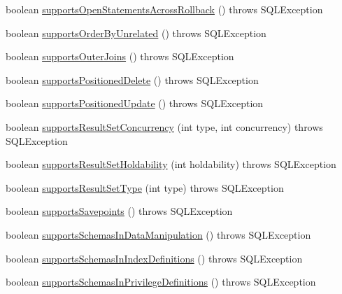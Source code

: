 \begin{DoxyCompactItemize}
\item 
boolean \mbox{\hyperlink{classcom_1_1mysql_1_1jdbc_1_1_database_meta_data_a1b59c56b378d4d91fc6f113c2758672b}{supports\+Open\+Statements\+Across\+Rollback}} ()  throws S\+Q\+L\+Exception 
\item 
boolean \mbox{\hyperlink{classcom_1_1mysql_1_1jdbc_1_1_database_meta_data_a198d63c037b4e7e315448f03ab6ae109}{supports\+Order\+By\+Unrelated}} ()  throws S\+Q\+L\+Exception 
\item 
boolean \mbox{\hyperlink{classcom_1_1mysql_1_1jdbc_1_1_database_meta_data_a06a7b70011cbdf146cde2d6bad2b3267}{supports\+Outer\+Joins}} ()  throws S\+Q\+L\+Exception 
\item 
boolean \mbox{\hyperlink{classcom_1_1mysql_1_1jdbc_1_1_database_meta_data_af730aaff017aeefb5a7d019b6e370f6c}{supports\+Positioned\+Delete}} ()  throws S\+Q\+L\+Exception 
\item 
boolean \mbox{\hyperlink{classcom_1_1mysql_1_1jdbc_1_1_database_meta_data_a50233d46e523a8369a02ff3a52137c32}{supports\+Positioned\+Update}} ()  throws S\+Q\+L\+Exception 
\item 
boolean \mbox{\hyperlink{classcom_1_1mysql_1_1jdbc_1_1_database_meta_data_a78549c381a36ac93cfac55d0cc4760bf}{supports\+Result\+Set\+Concurrency}} (int type, int concurrency)  throws S\+Q\+L\+Exception 
\item 
boolean \mbox{\hyperlink{classcom_1_1mysql_1_1jdbc_1_1_database_meta_data_a75ad03ea2835ac88e0a16dd0fa81cf0d}{supports\+Result\+Set\+Holdability}} (int holdability)  throws S\+Q\+L\+Exception 
\item 
boolean \mbox{\hyperlink{classcom_1_1mysql_1_1jdbc_1_1_database_meta_data_ab0801f98fb063d2f7d734b19405b6fcf}{supports\+Result\+Set\+Type}} (int type)  throws S\+Q\+L\+Exception 
\item 
boolean \mbox{\hyperlink{classcom_1_1mysql_1_1jdbc_1_1_database_meta_data_ad320246c571d9f4597ffae3acbb781f6}{supports\+Savepoints}} ()  throws S\+Q\+L\+Exception 
\item 
boolean \mbox{\hyperlink{classcom_1_1mysql_1_1jdbc_1_1_database_meta_data_a461feee50c67174a4b4bcd36c2588d87}{supports\+Schemas\+In\+Data\+Manipulation}} ()  throws S\+Q\+L\+Exception 
\item 
boolean \mbox{\hyperlink{classcom_1_1mysql_1_1jdbc_1_1_database_meta_data_aadef2e39677c00867744cb0bf389fd97}{supports\+Schemas\+In\+Index\+Definitions}} ()  throws S\+Q\+L\+Exception 
\item 
boolean \mbox{\hyperlink{classcom_1_1mysql_1_1jdbc_1_1_database_meta_data_ae1439cb03ad456722ce61b8b970aebb7}{supports\+Schemas\+In\+Privilege\+Definitions}} ()  throws S\+Q\+L\+Exception 

\end{DoxyCompactItemize}
